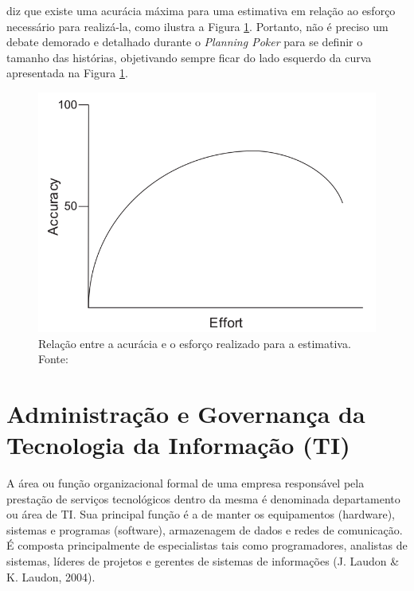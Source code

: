      diz que existe uma acurácia máxima para uma estimativa
    em relação ao esforço necessário para realizá-la, como ilustra a Figura \ref{fig:effort_accuracy}.
    Portanto, não é preciso um debate demorado e detalhado durante o \textit{Planning Poker} para se definir
    o tamanho das histórias, objetivando sempre ficar do lado esquerdo da curva apresentada na Figura \ref{fig:effort_accuracy}.



    \begin{figure}[!htb]
      \centering
      \includegraphics[scale=0.4]{figuras/effort_accuracy}
      \caption[Relação entre a acurácia e o esforço realizado para a estimativa.]
	      {Relação entre a acurácia e o esforço realizado para a estimativa. Fonte: \cite{cohn06}}
      \label{fig:effort_accuracy}
    \end{figure}



  \section{Administração e Governança da Tecnologia da Informação (TI)}

    A área ou função organizacional formal de uma empresa responsável pela prestação de serviços tecnológicos dentro da mesma é denominada departamento ou área de TI. Sua principal função é a de manter os equipamentos (hardware), sistemas e programas (software), armazenagem de dados e redes de comunicação. É composta principalmente de especialistas tais como programadores, analistas de sistemas, líderes de projetos e gerentes de sistemas de informações (J. Laudon & K. Laudon, 2004).

